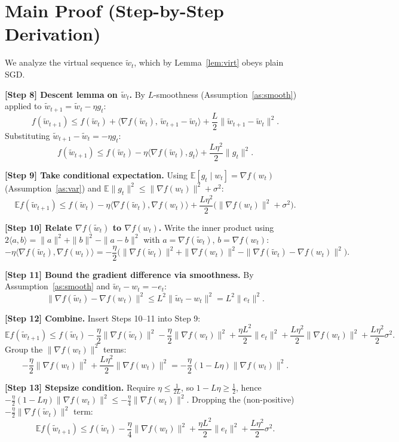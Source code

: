 \documentclass[11pt]{article}
\theoremstyle{plain}
\begin{document}
\section*{Main Proof (Step-by-Step Derivation)}

We analyze the virtual sequence $\tilde w_t$, which by Lemma~\ref{lem:virt} obeys plain SGD.

\medskip
\textbf{[Step 8] Descent lemma on $\tilde w_t$.}
By $L$-smoothness (Assumption~\ref{as:smooth}) applied to $\tilde w_{t+1}=\tilde w_t-\eta g_t$:
\[
f(\tilde w_{t+1})\le f(\tilde w_t)+\langle\nabla f(\tilde w_t),\,\tilde w_{t+1}-\tilde w_t\rangle+\frac{L}{2}\|\tilde w_{t+1}-\tilde w_t\|^2 .
\]
Substituting $\tilde w_{t+1}-\tilde w_t=-\eta g_t$:
\[
f(\tilde w_{t+1})\le f(\tilde w_t)-\eta\langle\nabla f(\tilde w_t),g_t\rangle+\frac{L\eta^2}{2}\|g_t\|^2 .
\]

\medskip
\textbf{[Step 9] Take conditional expectation.}
Using $\mathbb{E}[g_t\mid w_t]=\nabla f(w_t)$ (Assumption~\ref{as:var}) and $\mathbb{E}\|g_t\|^2\le\|\nabla f(w_t)\|^2+\sigma^2$:
\[
\mathbb{E}f(\tilde w_{t+1})\le f(\tilde w_t)-\eta\langle\nabla f(\tilde w_t),\nabla f(w_t)\rangle+\frac{L\eta^2}{2}\big(\|\nabla f(w_t)\|^2+\sigma^2\big).
\]

\medskip
\textbf{[Step 10] Relate $\nabla f(\tilde w_t)$ to $\nabla f(w_t)$.}
Write the inner product using $2\langle a,b\rangle=\|a\|^2+\|b\|^2-\|a-b\|^2$ with $a=\nabla f(\tilde w_t)$, $b=\nabla f(w_t)$:
\[
-\eta\langle\nabla f(\tilde w_t),\nabla f(w_t)\rangle
=-\frac{\eta}{2}\Big(\|\nabla f(\tilde w_t)\|^2+\|\nabla f(w_t)\|^2-\|\nabla f(\tilde w_t)-\nabla f(w_t)\|^2\Big).
\]

\medskip
\textbf{[Step 11] Bound the gradient difference via smoothness.}
By Assumption~\ref{as:smooth} and $\tilde w_t-w_t=-e_t$:
\[
\|\nabla f(\tilde w_t)-\nabla f(w_t)\|^2\le L^2\|\tilde w_t-w_t\|^2=L^2\|e_t\|^2 .
\]

\medskip
\textbf{[Step 12] Combine.}
Insert Steps 10--11 into Step 9:
\[
\mathbb{E}f(\tilde w_{t+1})\le f(\tilde w_t)
-\frac{\eta}{2}\|\nabla f(\tilde w_t)\|^2
-\frac{\eta}{2}\|\nabla f(w_t)\|^2
+\frac{\eta L^2}{2}\|e_t\|^2
+\frac{L\eta^2}{2}\|\nabla f(w_t)\|^2
+\frac{L\eta^2}{2}\sigma^2 .
\]
Group the $\|\nabla f(w_t)\|^2$ terms:
\[
-\frac{\eta}{2}\|\nabla f(w_t)\|^2+\frac{L\eta^2}{2}\|\nabla f(w_t)\|^2
=-\frac{\eta}{2}(1-L\eta)\|\nabla f(w_t)\|^2 .
\]

\medskip
\textbf{[Step 13] Stepsize condition.}
Require $\eta\le\frac{1}{2L}$, so $1-L\eta\ge\frac12$, hence
$-\frac{\eta}{2}(1-L\eta)\|\nabla f(w_t)\|^2\le-\frac{\eta}{4}\|\nabla f(w_t)\|^2.$
Dropping the (non-positive) $-\frac{\eta}{2}\|\nabla f(\tilde w_t)\|^2$ term:
\[
\mathbb{E}f(\tilde w_{t+1})\le f(\tilde w_t)
-\frac{\eta}{4}\|\nabla f(w_t)\|^2
+\frac{\eta L^2}{2}\|e_t\|^2
+\frac{L\eta^2}{2}\sigma^2 .
\]
\end{document}
